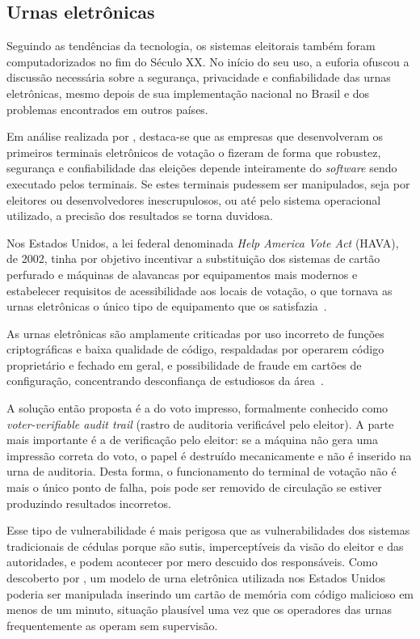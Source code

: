 \subsection{Urnas eletrônicas}

Seguindo as tendências da tecnologia, os sistemas eleitorais também foram
computadorizados no fim do Século XX. No início do seu uso, a euforia ofuscou a
discussão necessária sobre a segurança, privacidade e confiabilidade das urnas
eletrônicas, mesmo depois de sua implementação nacional no Brasil e dos
problemas encontrados em outros países.

Em análise realizada por \textcite{kohno2004analysis}, destaca-se que as
empresas que desenvolveram os primeiros terminais eletrônicos de votação o
fizeram de forma que robustez, segurança e confiabilidade das eleições depende
inteiramente do \textit{software} sendo executado pelos terminais. Se estes
terminais pudessem ser manipulados, seja por eleitores ou desenvolvedores
inescrupulosos, ou até pelo sistema operacional utilizado, a precisão dos
resultados se torna duvidosa.

Nos Estados Unidos, a lei federal denominada \textit{Help America Vote Act}
(HAVA), de 2002, tinha por objetivo incentivar a substituição dos sistemas de
cartão perfurado e máquinas de alavancas por equipamentos mais modernos e
estabelecer requisitos de acessibilidade aos locais de votação, o que tornava
as urnas eletrônicas o único tipo de equipamento que os
satisfazia~\cite{davis1996direct}.

As urnas eletrônicas são amplamente criticadas por uso incorreto de funções
criptográficas e baixa qualidade de código, respaldadas por operarem código
proprietário e fechado em geral, e possibilidade de fraude em cartões de
configuração, concentrando desconfiança de estudiosos da
área~\cite{feldman2006security}.

A solução então proposta é a do voto impresso, formalmente
conhecido como \textit{voter-verifiable audit trail} (rastro de auditoria
verificável pelo eleitor). A parte mais importante é a de verificação pelo
eleitor: se a máquina não gera uma impressão correta do voto, o papel é
destruído mecanicamente e não é inserido na urna de auditoria. Desta forma, o
funcionamento do terminal de votação não é mais o único ponto de falha, pois
pode ser removido de circulação se estiver produzindo resultados incorretos.

Esse tipo de vulnerabilidade é mais perigosa que as vulnerabilidades dos
sistemas tradicionais de cédulas porque são sutis, imperceptíveis da visão do
eleitor e das autoridades, e podem acontecer por mero descuido dos
responsáveis. Como descoberto por \textcite{feldman2006security}, um modelo de
urna eletrônica utilizada nos Estados Unidos poderia ser manipulada inserindo
um cartão de memória com código malicioso em menos de um minuto, situação
plausível uma vez que os operadores das urnas frequentemente as operam sem
supervisão.

